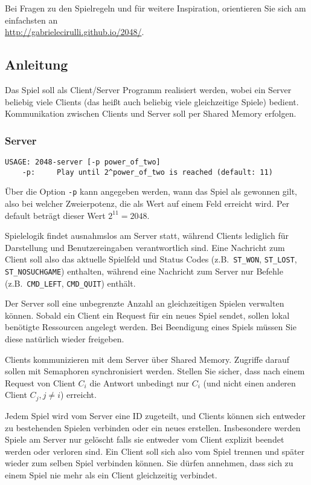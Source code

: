 Bei Fragen zu den Spielregeln und für weitere Inspiration, orientieren Sie sich
am einfachsten an\\
\url{http://gabrielecirulli.github.io/2048/}.


\subsection*{Anleitung}

Das Spiel soll als Client/Server Programm realisiert werden, wobei ein Server
beliebig viele Clients (das heißt auch beliebig viele gleichzeitige Spiele)
bedient. Kommunikation zwischen Clients und Server soll per Shared Memory
erfolgen.

\subsubsection*{Server}
\label{sec:server}

\begin{verbatim}
USAGE: 2048-server [-p power_of_two]
    -p:     Play until 2^power_of_two is reached (default: 11)
\end{verbatim}

Über die Option \verb|-p| kann angegeben werden, wann das Spiel als gewonnen
gilt, also bei welcher Zweierpotenz, die als Wert auf einem Feld erreicht wird.
Per default beträgt dieser Wert $2^{11} = 2048$.

Spielelogik findet ausnahmslos am Server statt, während Clients lediglich für
Darstellung und Benutzereingaben verantwortlich sind. Eine Nachricht zum Client
soll also das aktuelle Spielfeld und Status Codes (z.B.\ \verb|ST_WON|,
\verb|ST_LOST|, \verb|ST_NOSUCHGAME|) enthalten, während eine Nachricht zum
Server nur Befehle (z.B.\ \verb|CMD_LEFT|, \verb|CMD_QUIT|) enthält.

Der Server soll eine unbegrenzte Anzahl an gleichzeitigen Spielen verwalten
können.  Sobald ein Client ein Request für ein neues Spiel sendet, sollen lokal
benötigte Ressourcen angelegt werden. Bei Beendigung eines Spiels müssen Sie
diese natürlich wieder freigeben.

Clients kommunizieren mit dem Server über Shared Memory.  Zugriffe
darauf sollen mit Semaphoren synchronisiert werden. Stellen Sie sicher, dass
nach einem Request von Client $C_i$ die Antwort unbedingt nur $C_i$ (und nicht
einen anderen Client $C_j, j \neq i$) erreicht.

Jedem Spiel wird vom Server eine ID zugeteilt, und Clients können sich entweder
zu bestehenden Spielen verbinden oder ein neues erstellen. Insbesondere werden
Spiele am Server nur gelöscht falls sie entweder vom Client explizit beendet
werden oder verloren sind. Ein Client soll sich also vom Spiel trennen und
später wieder zum selben Spiel verbinden können. Sie dürfen annehmen, dass sich
zu einem Spiel nie mehr als ein Client gleichzeitig verbindet.


